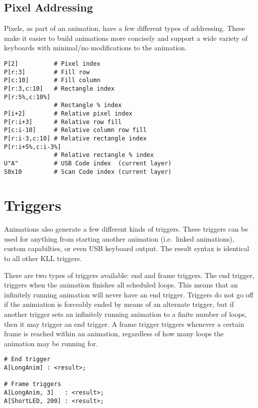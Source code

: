 \documentclass{kiibohd-template}
\begin{document}
\subsection{Pixel Addressing}

Pixels, as part of an animation, have a few different types of addressing.
These make it easier to build animations more concisely and support a wide variety of keyboards with minimal/no modifications to the animation.

\begin{lstlisting}
P[2]          # Pixel index
P[r:3]        # Fill row
P[c:10]       # Fill column
P[r:3,c:10]   # Rectangle index
P[r:5%,c:10%]
              # Rectangle % index
P[i+2]        # Relative pixel index
P[r:i+3]      # Relative row fill
P[c:i-10]     # Relative column row fill
P[r:i-3,c:10] # Relative rectangle index
P[r:i+5%,c:i-3%]
              # Relative rectangle % index
U"A"          # USB Code index  (current layer)
S0x10         # Scan Code index (current layer)
\end{lstlisting}


\section{Triggers}

Animations also generate a few different kinds of triggers.
These triggers can be used for anything from starting another animation (i.e.\ linked animations), custom capabilties, or even USB keyboard output.
The result syntax is identical to all other KLL triggers.

There are two types of triggers available: end and frame triggers.
The end trigger, triggers when the animation finishes all scheduled loops.
This means that an infinitely running animation will never have an end trigger.
Triggers do not go off if the animiation is forceably ended by means of an alternate trigger, but if another trigger sets an infinitely running animation to a finite number of loops, then it may trigger an end trigger.
A frame trigger triggers whenever a certain frame is reached within an animation, regardless of how many loops the animation may be running for.

\begin{lstlisting}
# End trigger
A[LongAnim] : <result>;

# Frame triggers
A[LongAnim, 3]   : <result>;
A[ShortLED, 200] : <result>;
\end{lstlisting}
\end{document}
